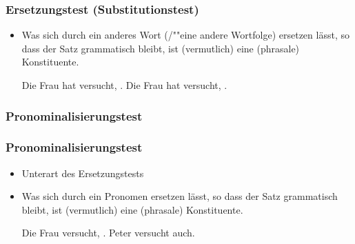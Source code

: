 
\begin{frame}
\frametitle{Ersetzungstest (Substitutionstest)}

\begin{itemize}
	\item Was sich durch ein anderes Wort (/""eine andere Wortfolge) ersetzen lässt, so dass der Satz grammatisch bleibt, ist (vermutlich) eine (phrasale) Konstituente.

	\eal 
	\zl

\pause	
	\eal 
	\ex Die Frau hat versucht, .
	\ex Die Frau hat versucht, .
	\zl
	
\end{itemize}

\nocite{MyP18m}

\end{frame}


\subsubsection{Pronominalisierungstest}


\begin{frame}
\frametitle{Pronominalisierungstest}

\begin{itemize}
	\item Unterart des Ersetzungstests
	\medskip
	\item Was sich durch ein Pronomen ersetzen lässt, so dass der Satz grammatisch bleibt, ist (vermutlich) eine (phrasale) Konstituente.

	\eal 
	\zl

\pause	
	\eal 
	\ex Die Frau versucht, .
	\ex Peter versucht \alertred{[das]} auch.
	\zl
	
\end{itemize}

\end{frame}


